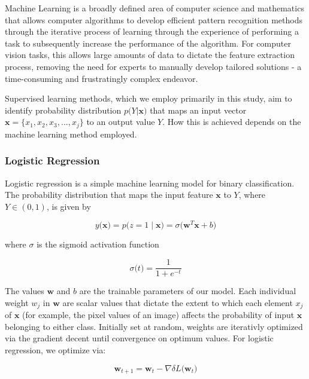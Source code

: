 \documentclass{article}
\renewcommand{\vec}[1]{\mathbf{#1}}
\begin{document}
Machine Learning is a broadly defined area of computer science and mathematics that allows computer algorithms to develop efficient pattern recognition methods through the iterative process of learning through the experience of performing a task to subsequently increase the performance of the algorithm. For computer vision tasks, this allows large amounts of data to dictate the feature extraction process, removing the need for experts to manually develop tailored solutions - a time-consuming and frustratingly complex endeavor. 

Supervised learning methods, which we employ primarily in this study, aim to identify probability distribution \(p \big(Y |  \vec{x} \big)\) that maps an input vector \(\vec{x} = \big\{x_1, x_2, x_3, ..., x_j\big\}\) to an output value \(Y\). How this is achieved depends on the machine learning method employed. 

\subsubsection{\label{sec:level3}Logistic Regression}

Logistic regression is a simple machine learning model for binary classification. The probability distribution that maps the input feature \(\vec{x}\) to \(Y\), where \(Y \in (0, 1)\), is given by 

\begin{equation}
    y \big( \vec{x} \big) = p \big(z=1 \mid  \vec{x} \big) =  \sigma  \big(\vec{w}^{T}\vec{x}+b \big) 
\end{equation}

where \(\sigma\) is the sigmoid activation function

\begin{equation}
    \sigma  \big(t\big) = \frac{1}{1+e^{-t}}
\end{equation}

The values \(\vec{w}\) and \(b\) are the trainable parameters of our model. Each individual weight \(w_{j}\) in \(\vec{w}\) are scalar values that dictate the extent to which each element \(x_{j}\) of \(\vec{x}\) (for example, the pixel values of an image) affects the probability of input \(\vec{x}\) belonging to either class. Initially set at random, weights are iterativly optimized via the gradient decent until convergence on optimum values. For logistic regression, we optimize via:

\begin{equation}
    \vec{w}_{t+1} = \vec{w}_{t} -  \nabla \delta L \big(\vec{w}_{t}\big) 
\end{equation}
\end{document}
